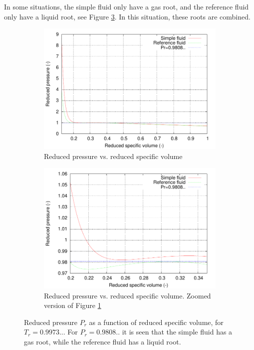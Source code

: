 \documentclass[internal,english]{sintefmemo2012}
\numberwithin{equation}{section}
\begin{document}
In some situations, the simple fluid only have a gas root, and the
reference fluid only have a liquid root, see Figure \ref{fig:roots}. In
this situation, these roots are combined. 
\begin{figure}[h]
  \begin{subfigure}[b]{0.45\linewidth}
    \centering
    \includegraphics[width=1.0\textwidth]{roots}
    \caption{Reduced pressure vs. reduced specific volume}
    \label{fig:roots_a}
  \end{subfigure}
  \hfill
  \begin{subfigure}[b]{0.45\linewidth}
    \centering
    \includegraphics[width=1.0\textwidth]{roots_zoom}
    \caption{Reduced pressure vs. reduced specific volume. Zoomed
      version of Figure \ref{fig:roots_a}}
    \label{fig:roots_b}
  \end{subfigure}
  \caption{Reduced pressure $P_r$ as a function of reduced specific
    volume, for $T_r = 0.9973..$. For $P_r = 0.9808..$ it is seen that the
    simple fluid has a gas root, while the reference fluid has a liquid root.}
  \label{fig:roots}
\end{figure}
\end{document}
